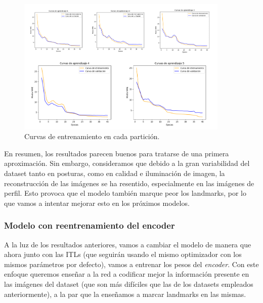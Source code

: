             \begin{figure}[!h]
                \centering
                \includegraphics[width=0.9\textwidth]{img/curvas_aprendizaje_modelbase.png}
                \caption{Curvas de entrenamiento en cada partición.}
                \label{fig:Curvas_modelbase}
            \end{figure}

            \noindent En resumen, los resultados parecen buenos para tratarse de una primera aproximación. Sin embargo, consideramos que debido a la gran variabilidad del dataset tanto en posturas, como en calidad e iluminación de imagen, la reconstrucción de las imágenes se ha resentido, especialmente en las imágenes de perfil. Esto provoca que el modelo también marque peor los landmarks, por lo que vamos a intentar mejorar esto en los próximos modelos.

        \subsubsection{Modelo con reentrenamiento del encoder}
            \noindent A la luz de los resultados anteriores, vamos a cambiar el modelo de manera que ahora junto con las ITLs (que seguirán usando el mismo optimizador con los mismos parámetros por defecto), vamos a entrenar los pesos del \textit{encoder}. Con este enfoque queremos enseñar a la red a codificar mejor la información presente en las imágenes del dataset (que son más difíciles que las de los datasets empleados anteriormente), a la par que la enseñamos a marcar landmarks en las mismas. 

            \medskip

